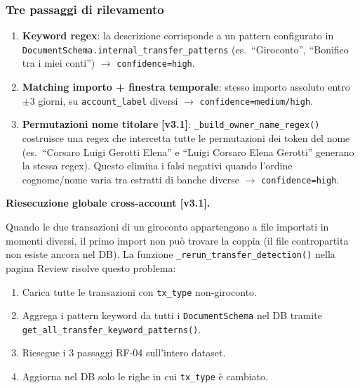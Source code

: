 \documentclass[11pt, a4paper]{article}
\begin{document}
\subsubsection{Tre passaggi di rilevamento}

\begin{enumerate}[leftmargin=2em]
  \item \textbf{Keyword regex}: la descrizione corrisponde a un pattern configurato
        in \texttt{DocumentSchema.internal\_transfer\_patterns} (es.\ ``Giroconto'',
        ``Bonifico tra i miei conti'') $\to$ \texttt{confidence=high}.
  \item \textbf{Matching importo + finestra temporale}: stesso importo assoluto entro
        $\pm 3$ giorni, su \texttt{account\_label} diversi $\to$
        \texttt{confidence=medium/high}.
  \item \textbf{Permutazioni nome titolare} \textbf{[v3.1]}:
        \texttt{\_build\_owner\_name\_regex()} costruisce una regex che intercetta
        tutte le permutazioni dei token del nome (es.\ ``Corsaro Luigi Gerotti Elena''
        e ``Luigi Corsaro Elena Gerotti'' generano la stessa regex). Questo elimina
        i falsi negativi quando l'ordine cognome/nome varia tra estratti di banche
        diverse $\to$ \texttt{confidence=high}.
\end{enumerate}

\begin{v31box}
\textbf{Riesecuzione globale cross-account [v3.1].}

Quando le due transazioni di un giroconto appartengono a file importati in momenti
diversi, il primo import non può trovare la coppia (il file contropartita non esiste
ancora nel DB). La funzione \texttt{\_rerun\_transfer\_detection()} nella pagina
Review risolve questo problema:

\begin{enumerate}[leftmargin=1.5em]
  \item Carica tutte le transazioni con \texttt{tx\_type} non-giroconto.
  \item Aggrega i pattern keyword da tutti i \texttt{DocumentSchema} nel DB
        tramite \texttt{get\_all\_transfer\_keyword\_patterns()}.
  \item Riesegue i 3 passaggi RF-04 sull'intero dataset.
  \item Aggiorna nel DB solo le righe in cui \texttt{tx\_type} è cambiato.
\end{enumerate}
\end{v31box}
\end{document}
